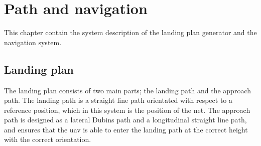 \chapter{Path and navigation}\label{CH:PathNavigation}
This chapter contain the system description of the landing plan generator and the navigation system.
\section{Landing plan}\label{Ch:LandingPlan}
The landing plan consists of two main parts; the landing path and the approach path. The landing path is a straight line path orientated with respect to a reference position, which in this system is the position of the net. The approach path is designed as a lateral Dubins path and a longitudinal straight line path, and ensures that the \gls{uav} is able to enter the landing path at the correct height with the correct orientation.
